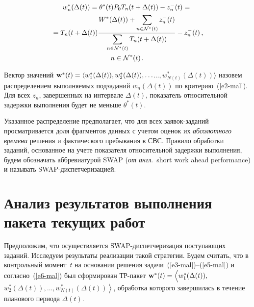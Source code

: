 \begin{multicols}{2}
\vspace*{-12pt}

\noindent
\begin{multline*}
w_n^*(\Delta (t))= \theta^*(t)   P_0  T_n(t+\Delta(t))  - z_n^-(t) =  {}\\
{} =T_n(t + \Delta(t)) \displaystyle\frac{\displaystyle W^*(\Delta(t)) + \sum\limits_{n \in \mathcal{N}^*(t)}  z_n^-(t)\mathstrut}{\displaystyle  \sum\limits_{n \in \mathcal{N}^*(t)} T_n(t + \Delta(t)) \mathstrut} - z_n^-(t)\,,\\
 n \in \mathcal{N}^*(t)\,.
\end{multline*}

Вектор значений $ \textbf{w}^*(t) \hm= \langle w_1^*(\Delta(t)),
w_2^*(\Delta(t)), \ldots$\linebreak $\ldots , w_{N(t)}^*(\Delta(t)) \rangle $ назовем
распределением выполняемых подзаданий $w_{n}(\Delta(t))$ по критерию~(\ref{e2-mal}). 
Для всех $z_n$, завершенных на интервале $\Delta(t)$,
показатель относительной задержки выполнения будет не меньше
$\theta^*(t)$.

Указанное распределение предполагает, что для всех заявок-заданий
просматривается  доля фрагментов данных с учетом оценок их
\textit{абсолютного времени}  решения  и  фактического пребывания в
СВС. Правило обработки заданий, основанное на учете показателя
относительной задержки выполнения, будем обозначать аббревиатурой
SWAP (\textit{от англ}.\ short work ahead performance) и называть
SWAP-дис\-пет\-че\-ри\-за\-цией.

\vspace*{-6pt}

\section{Анализ результатов выполнения пакета текущих работ}

\vspace*{-2pt}

Предположим, что осуществляется SWAP-дис\-пет\-че\-ри\-за\-ция поступающих
заданий. Исследуем результаты реализации такой стратегии. Будем
считать, что в  контрольный момент~$t$ на осно\-ва\-нии  решения задачи~(\ref{e3-mal})--(\ref{e5-mal}) 
и согласно~(\ref{e6-mal}) был сформирован ТР-па\-кет  $\textbf{w}^*(t )
= \left\langle\vphantom{w_2^*(\Delta(t)), \ldots , 
w_{N(t)}^*(\Delta(t))} w_1^*(\Delta(t)),\right.$\linebreak $\left. w_2^*(\Delta(t)), \ldots , 
w_{N(t)}^*(\Delta(t))\right\rangle$, обработка которого завершилась в течение
планового  пе\-ри\-о\-да $\Delta(t)$.


\end{multicols}
